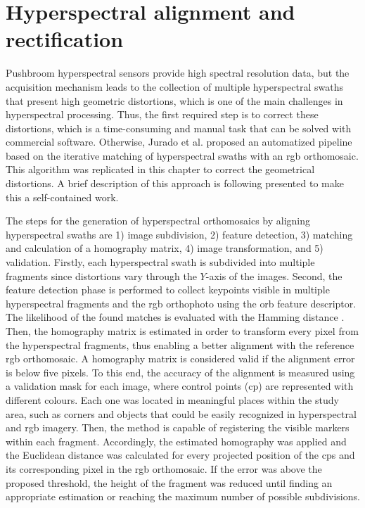 \section{Hyperspectral alignment and rectification}

Pushbroom hyperspectral sensors provide high spectral resolution data, but the acquisition mechanism leads to the collection of multiple hyperspectral swaths that present high geometric distortions, which is one of the main challenges in hyperspectral processing. Thus, the first required step is to correct these distortions, which is a time-consuming and manual task that can be solved with commercial software. Otherwise, Jurado et al. \cite{jurado_efficient_2021} proposed an automatized pipeline based on the iterative matching of hyperspectral swaths with an \acrshort{rgb} orthomosaic. This algorithm was replicated in this chapter to correct the geometrical distortions. A brief description of this approach is following presented to make this a self-contained work.

The steps for the generation of hyperspectral orthomosaics by aligning hyperspectral swaths are 1) image subdivision, 2) feature detection, 3) matching and calculation of a homography matrix, 4) image transformation, and 5) validation. Firstly, each hyperspectral swath is subdivided into multiple fragments since distortions vary through the $Y$-axis of the images. Second, the feature detection phase is performed to collect keypoints visible in multiple hyperspectral fragments and the \acrshort{rgb} orthophoto using the \acrshort{orb} feature descriptor. The likelihood of the found matches is evaluated with the Hamming distance \cite{norouzi_hamming_2012}. Then, the homography matrix is estimated in order to transform every pixel from the hyperspectral fragments, thus enabling a better alignment with the reference \acrshort{rgb} orthomosaic. A homography matrix is considered valid if the alignment error is below five pixels. To this end, the accuracy of the alignment is measured using a validation mask for each image, where control points (\acrshort{cp}) are represented with different colours. Each one was located in meaningful places within the study area, such as corners and objects that could be easily recognized in hyperspectral and \acrshort{rgb} imagery. Then, the method is capable of registering the visible markers within each fragment. Accordingly, the estimated homography was applied and the Euclidean distance was calculated for every projected position of the \acrshort{cp}s and its corresponding pixel in the \acrshort{rgb} orthomosaic. If the error was above the proposed threshold, the height of the fragment was reduced until finding an appropriate estimation or reaching the maximum number of possible subdivisions.

